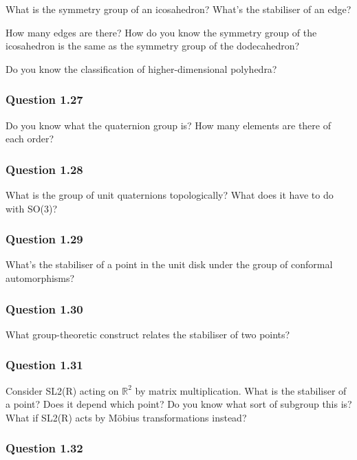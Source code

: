 What is the symmetry group of an icosahedron? What's the stabiliser of
an edge?

How many edges are there? How do you know the symmetry group of the
icosahedron is the same as the symmetry group of the dodecahedron?

Do you know the classification of higher-dimensional polyhedra?

\hypertarget{question-1.27}{%
\subsubsection{Question 1.27}\label{question-1.27}}

Do you know what the quaternion group is? How many elements are there of
each order?

\hypertarget{question-1.28}{%
\subsubsection{Question 1.28}\label{question-1.28}}

What is the group of unit quaternions topologically? What does it have
to do with SO(3)?

\hypertarget{question-1.29}{%
\subsubsection{Question 1.29}\label{question-1.29}}

What's the stabiliser of a point in the unit disk under the group of
conformal automorphisms?

\hypertarget{question-1.30}{%
\subsubsection{Question 1.30}\label{question-1.30}}

What group-theoretic construct relates the stabiliser of two points?

\hypertarget{question-1.31}{%
\subsubsection{Question 1.31}\label{question-1.31}}

Consider SL2(R) acting on \({\mathbb{R}}^2\) by matrix multiplication.
What is the stabiliser of a point? Does it depend which point? Do you
know what sort of subgroup this is? What if SL2(R) acts by Möbius
transformations instead?

\hypertarget{question-1.32}{%
\subsubsection{Question 1.32}\label{question-1.32}}

